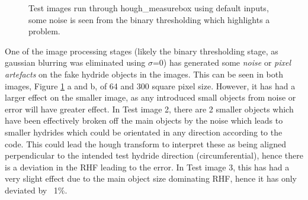 \documentclass{article}
\begin{document}
\begin{figure}
    \centering
    \hfill
    \caption{Test images run through hough\_measurebox using default inputs, some noise is seen from the binary thresholding which highlights a problem.}
    \label{TestImagesProcessed}
\end{figure}

One of the image processing stages (likely the binary thresholding stage, as gaussian blurring was eliminated using $\sigma$=0) has generated some \textit{noise} or \textit{pixel artefacts} on the fake hydride objects in the images. This can be seen in both images, Figure \ref{TestImagesProcessed} a and b, of 64 and 300 square pixel size. However, it has had a larger effect on the smaller image, as any introduced small objects from noise or error will have greater effect. In Test image 2, there are 2 smaller objects which have been effectively broken off the main objects by the noise which leads to smaller hydrides which could be orientated in any direction according to the code. This could lead the hough transform to interpret these as being aligned perpendicular to the intended test hydride direction (circumferential), hence there is a deviation in the RHF leading to the error. In Test image 3, this has had a very slight effect due to the main object size dominating RHF, hence it has only deviated by ~1\%. 
\end{document}
